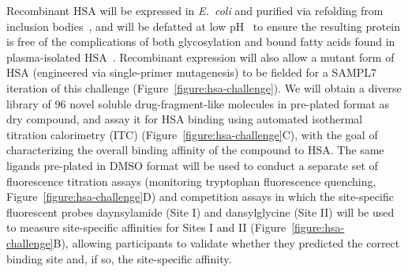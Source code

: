 \documentclass[11pt]{article}
\begin{document}
Recombinant HSA will be expressed in \emph{E.~coli} and purified via refolding from inclusion bodies~\cite{Latta:1987:Bio/Technology}, and will be defatted at low pH~\cite{Lang:2015:BiotechnologyProgress} to ensure the resulting protein is free of the complications of both glycosylation and bound fatty acids found in plasma-isolated HSA~\cite{Lang:2015:BiotechnologyProgress}.
Recombinant expression will also allow a mutant form of HSA (engineered via single-primer mutagenesis) to be fielded for a SAMPL7 iteration of this challenge (Figure~\ref{figure:hsa-challenge}).
We will obtain a diverse library of 96 novel soluble drug-fragment-like molecules in pre-plated format as dry compound, and assay it for HSA binding using automated isothermal titration calorimetry (ITC) (Figure~\ref{figure:hsa-challenge}C), with the goal of characterizing the overall binding affinity of the compound to HSA.
The same ligands pre-plated in DMSO format will be used to conduct a separate set of fluorescence titration assays (monitoring tryptophan fluorescence quenching, Figure~\ref{figure:hsa-challenge}D) and competition assays in which the site-specific fluorescent probes daynsylamide (Site I) and dansylglycine (Site II) will be used to measure site-specific affinities for Sites I and II (Figure~\ref{figure:hsa-challenge}B), allowing participants to validate whether they predicted the correct binding site and, if so, the site-specific affinity.
\end{document}
